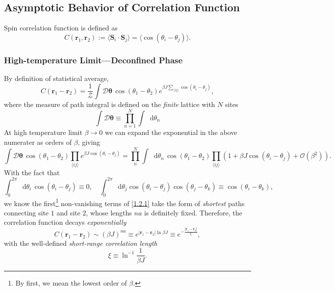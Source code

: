 \documentclass[10pt,nofootinbib]{revtex4}
\newcommand*\dd{\mathop{}\!\mathrm{d}}
\def\Z{\mathcal{Z}}
\begin{document}
	\subsection{Asymptotic Behavior of Correlation Function}
		Spin correlation function is defined as
		\begin{equation*}
			C(\bm{r}_1,\bm{r}_2):=\langle\bm{S}_i\cdot\bm{S}_j\rangle=\langle\cos(\theta_i-\theta_j)\rangle.
		\end{equation*}
		\subsubsection{High-temperature Limit---Deconfined Phase}
			By definition of statistical average,
			\begin{equation*}
				C(\bm{r}_1-\bm{r}_2)=\dfrac{1}{\Z}\int\mathcal{D}\bm{\theta}\,\cos(\theta_1- \theta_2)e^{\beta J\sum_{\langle ij \rangle }\cos(\theta_i-\theta_j)},
			\end{equation*}
			where the measure of path integral is defined on the \emph{finite} lattice with $N$ sites
			\begin{equation*}
				\int\mathcal{D}\bm{\theta}\equiv\prod_{n=1}^N\int\dd\theta_n
			\end{equation*}
			At high temperature limit $\beta\rightarrow0$ we can expand the exponential in the above numerater as orders of $\beta$, giving
			\begin{equation}\label{1.2.1}
				\int\mathcal{D}\bm{\theta}\,\cos(\theta_1-\theta_2)\prod_{\langle ij \rangle }e^{\beta J\cos(\theta_i-\theta_j)}=\prod_n^N\int\dd\theta_n\,\cos(\theta_1-\theta_2)\prod_{\langle ij \rangle }(1+\beta J\cos(\theta_i-\theta_j)+\mathcal{O}(\beta^2)).
			\end{equation}
			With the fact that
			\begin{equation*}
				\int_0^{2\pi}\dd\theta_i\,\cos(\theta_i-\theta_j)\equiv0,\quad \int_0^{2\pi}\dd\theta_j\cos(\theta_i-\theta_j)\cos(\theta_j-\theta_k)\equiv\cos(\theta_i-\theta_k),
			\end{equation*}
			we know the first\footnote{By first, we mean the lowest order of $\beta$.} non-vanishing terms of \eqref{1.2.1} take the form of \emph{shortest} paths connecting site $1$ and site $2$, whose lengths $na$ is definitely fixed. Therefore, the correlation function decays \emph{exponentially}
			\begin{equation}\label{1.2.2}
				C(\bm{r}_1-\bm{r}_2)\sim (\beta J)^{na}\equiv e^{|\bm{r}_1-\bm{r}_2|\ln\beta J}\equiv e^{-\frac{|\bm{r}_1-\bm{r}_2|}{\xi}},
			\end{equation}
			with the well-defined \emph{short-range correlation length}
			\begin{equation}\label{1.2.3}
				\xi\equiv\ln^{-1}\frac{1}{\beta J}.
			\end{equation}
\end{document}
